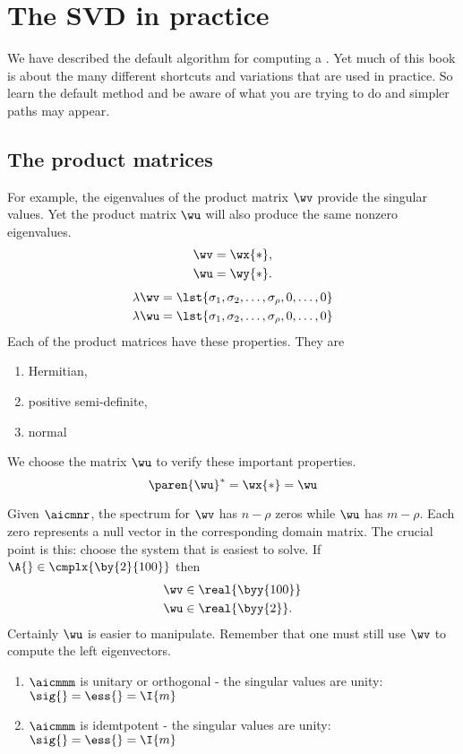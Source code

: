 \section{The SVD in practice}
We have described the default algorithm for computing a \asvd. Yet much of this book is about the many different shortcuts and variations that are used in practice. So learn the default method and be aware of what you are trying to do and simpler paths may appear. 

\subsection{The product matrices}
For example, the eigenvalues of the product matrix $\wv$ provide the singular values. Yet the product matrix $\wu$ will also produce the same nonzero eigenvalues.
\begin{equation}
  \begin{split}
    \wv &= \wx{*} , \\
    \wu &= \wy{*} .
  \end{split}
  \label{eqn:the product matrices}
\end{equation}
%
\begin{equation}
  \begin{split}
    \lambda{\wv} &= \lst{\sigma_{1}, \sigma_{2}, \dots, \sigma_{\rho}, 0, \dots, 0} \\
    \lambda{\wu} &= \lst{\sigma_{1}, \sigma_{2}, \dots, \sigma_{\rho}, 0, \dots, 0} 
  \end{split}
\end{equation}
%
Each of the product matrices have these properties. They are 
\begin{enumerate}
%
  \item Hermitian,
  \item positive semi-definite,
  \item normal
%
\end{enumerate}
We choose the matrix $\wu$ to verify these important properties.
\begin{equation}
  \paren{\wu}^{*} = \wx{*} = \wu
\end{equation}


%
Given $\aicmnr$, the spectrum for $\wv$ has $n-\rho$ zeros while $\wu$ has $m-\rho$. Each zero represents a null vector in the corresponding domain matrix. The crucial point is this: choose the system that is easiest to solve. If $\A{}\in\cmplx{\by{2}{100}}$ then
\begin{equation}
  \begin{split}
    \wv &\in \real{\byy{100}} \\
    \wu &\in \real{\byy{2}}.
  \end{split}
\end{equation}
Certainly $\wu$ is easier to manipulate. Remember that one must still use $\wv$ to compute the left eigenvectors.

\begin{enumerate}
\item $\aicmmm$ is unitary or orthogonal - the singular values are unity: $\sig{} = \ess{} = \I{m}$
\item $\aicmmm$ is idemtpotent - the singular values are unity: $\sig{} = \ess{} = \I{m}$
\end{enumerate}


\endinput